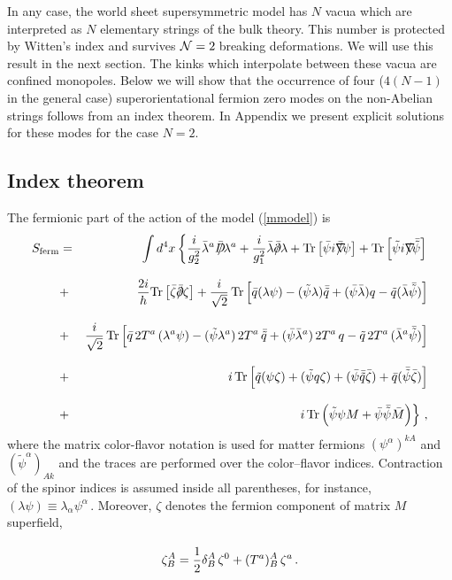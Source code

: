 \documentclass[epsfig,12pt]{article}
\def\beqn{\begin{eqnarray}}
\def\eeqn{\end{eqnarray}}
\def\beq{\begin{equation}}
\def\eeq{\end{equation}}
\newcommand{\ntwo}{${\cal N}=2\;$}
\newcommand{\pt}{\partial}
\begin{document}
In any case, the world sheet supersymmetric  model has $N$ vacua which 
are interpreted as
$N$ elementary strings of the bulk theory. This number is protected by Witten's index and
survives \ntwo breaking deformations. We will use this result in the next section.
The kinks which interpolate between these vacua are confined monopoles.
Below we  will show that the occurrence  of four ($4(N-1)$  in the general case) 
superorientational fermion zero modes  on the  non-Abelian strings follows from an 
index theorem. In Appendix  we present explicit solutions for these modes for 
the case $N=2$. 

\subsection{ Index theorem}
\label{indext}

The  fermionic part of the action  of  the model (\ref{mmodel})
is
\beqn
S_{\rm ferm}
&=&
\int d^4 x\left\{
\frac{i}{g_2^2}\bar{\lambda}^a \bar{D}\hspace{-0.65em}/\lambda^{a}+
\frac{i}{g_1^2}\bar{\lambda} \bar{\pt}\hspace{-0.55em}/\lambda
+ {\rm Tr}\left[\bar{\psi} i\bar\nabla\hspace{-0.75em}/ \psi\right]
+ {\rm Tr}\left[\tilde{\psi} i\nabla\hspace{-0.75em}/ \bar{\tilde{\psi}}
\right]
\right.
\nonumber\\[3mm]
&+&
\frac{2i}{h}{\rm Tr}\left[\bar{\zeta} \bar{\pt}\hspace{-0.55em}/\zeta\right]
+\frac{i}{\sqrt{2}}\,{\rm Tr}\left[ \bar{q}(\lambda\psi)-
(\tilde{\psi}\lambda)\bar{\tilde{q}} +(\bar{\psi}\bar{\lambda})q-
\tilde{q}(\bar{\lambda}\bar{\tilde{\psi}})\right]
\nonumber\\[3mm]
&+&
\frac{i}{\sqrt{2}}\,{\rm Tr}\left[ \bar{q}\, 2T^a\, (\lambda^{a}\psi)-
(\tilde{\psi}\lambda^a)\, 2T^a\, \bar{\tilde{q}}
 +(\bar{\psi}\bar{\lambda}^a)\, 2T^a\, q -
\tilde{q}\,2T^a\, (\bar{\lambda}^{a}\bar{\tilde{\psi}})\right]
\nonumber\\[3mm]
&+&
i\,{\rm Tr}\left[ \tilde{q}(\psi\zeta)+
(\tilde{\psi}q\zeta) +(\bar{\psi}\bar{\tilde{q}}\bar{\zeta})+
\bar{q}(\bar{\tilde{\psi}}\bar{\zeta})\right]
\nonumber\\[3mm]
&+&
\left.
i\,{\rm Tr}\left(\tilde{\psi}\psi M+
\bar{\psi}
\bar{\tilde{\psi}}\bar{M}\right)
\right\}\,,
\label{fermact}
\eeqn
where the  matrix color-flavor notation is used for
matter fermions $(\psi^{\alpha})^{kA}$ and $(\tilde{\psi}^{\alpha})_{Ak}$
and the traces are performed
over the color--flavor indices. Contraction of the spinor indices is assumed
inside all parentheses, for instance,
$(\lambda\psi)\equiv \lambda_{\alpha}\psi^{\alpha}\,$.
Moreover, $\zeta$ denotes
the fermion component of matrix $M$ superfield,
\beq
\zeta^A_B=\frac12 \delta^A_B\, \zeta^0 + (T^a)^A_B\,\zeta^a\,.
\rule{0mm}{7mm}
\label{matrixzeta}
\eeq
\end{document}

